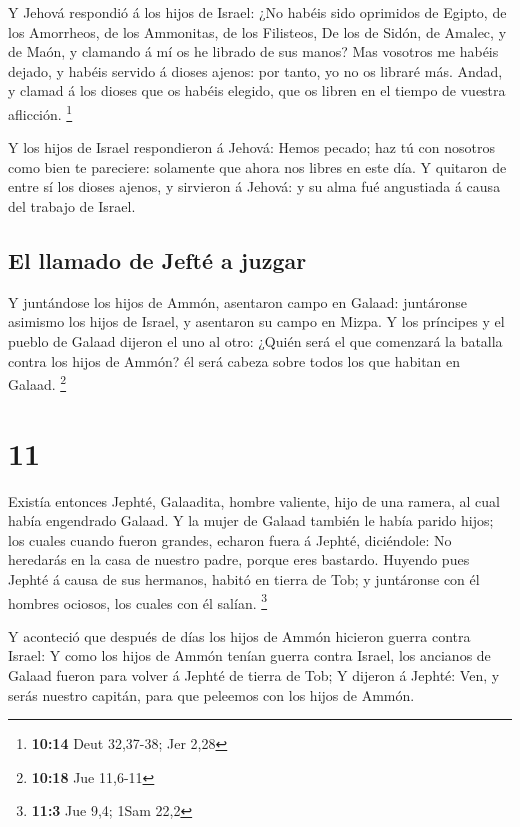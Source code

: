  Y Jehová respondió á los hijos de Israel: ¿No habéis sido
oprimidos de Egipto, de los Amorrheos, de los Ammonitas, de los
Filisteos,  De los de Sidón, de Amalec, y de Maón, y
clamando á mí os he librado de sus manos?  Mas vosotros me
habéis dejado, y habéis servido á dioses ajenos: por tanto, yo no os
libraré más.  Andad, y clamad á los dioses que os habéis
elegido, que os libren en el tiempo de vuestra aflicción. \footnote{\textbf{10:14}
  Deut 32,37-38; Jer 2,28}

 Y los hijos de Israel respondieron á Jehová: Hemos pecado;
haz tú con nosotros como bien te pareciere: solamente que ahora nos
libres en este día.  Y quitaron de entre sí los dioses
ajenos, y sirvieron á Jehová: y su alma fué angustiada á causa del
trabajo de Israel.

\hypertarget{el-llamado-de-jeftuxe9-a-juzgar}{%
\subsection{El llamado de Jefté a
juzgar}\label{el-llamado-de-jeftuxe9-a-juzgar}}

 Y juntándose los hijos de Ammón, asentaron campo en
Galaad: juntáronse asimismo los hijos de Israel, y asentaron su campo en
Mizpa.  Y los príncipes y el pueblo de Galaad dijeron el
uno al otro: ¿Quién será el que comenzará la batalla contra los hijos de
Ammón? él será cabeza sobre todos los que habitan en Galaad. \footnote{\textbf{10:18}
  Jue 11,6-11}

\hypertarget{section-10}{%
\section{11}\label{section-10}}

 Existía entonces Jephté, Galaadita, hombre valiente, hijo
de una ramera, al cual había engendrado Galaad.  Y la mujer
de Galaad también le había parido hijos; los cuales cuando fueron
grandes, echaron fuera á Jephté, diciéndole: No heredarás en la casa de
nuestro padre, porque eres bastardo.  Huyendo pues Jephté á
causa de sus hermanos, habitó en tierra de Tob; y juntáronse con él
hombres ociosos, los cuales con él salían. \footnote{\textbf{11:3} Jue
  9,4; 1Sam 22,2}

 Y aconteció que después de días los hijos de Ammón hicieron
guerra contra Israel:  Y como los hijos de Ammón tenían
guerra contra Israel, los ancianos de Galaad fueron para volver á Jephté
de tierra de Tob;  Y dijeron á Jephté: Ven, y serás nuestro
capitán, para que peleemos con los hijos de Ammón.

